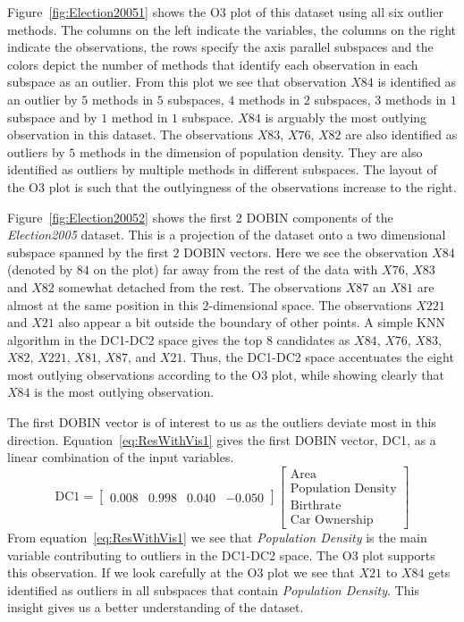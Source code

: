 \documentclass[letter,12pt]{article}
\begin{document}
Figure~\ref{fig:Election20051} shows the O3 plot of this dataset using all six outlier methods. The columns on the left indicate the variables, the columns on the right indicate the observations, the rows specify the axis parallel subspaces and the colors depict the number of methods that identify each observation in each subspace as an outlier. From this plot we see that observation $X84$ is identified as an outlier by $5$ methods in $5$ subspaces, $4$ methods in $2$ subspaces, $3$ methods in $1$ subspace and by $1$ method in $1$ subspace. $X84$ is arguably the most outlying observation in this dataset. The observations $X83$, $X76$, $X82$ are also identified as outliers by $5$ methods in the dimension of population density. They are also identified as outliers by multiple methods in different subspaces. The layout of the O3 plot is such that the outlyingness of the observations increase to the right.

Figure~\ref{fig:Election20052} shows the first $2$ DOBIN components of the \textit{Election2005} dataset. This is a projection of the dataset onto a two dimensional subspace spanned by the first $2$ DOBIN vectors. Here we see the observation $X84$ (denoted by $84$ on the plot) far away from the rest of the data with $X76$, $X83$ and $X82$ somewhat detached from the rest. The observations $X87$ an $X81$ are almost at the same position in this $2$-dimensional space. The observations $X221$ and $X21$ also appear a bit outside the boundary of other points. A simple KNN algorithm in the DC1-DC2 space gives the top $8$ candidates as $X84$, $X76$, $X83$, $X82$, $X221$, $X81$, $X87$, and $X21$. Thus, the DC1-DC2 space accentuates the eight most outlying observations according to the O3 plot, while showing clearly that $X84$ is the most outlying observation.

The first DOBIN vector is of interest to us as the outliers deviate most in this direction. Equation~\eqref{eq:ResWithVis1} gives the first DOBIN vector, DC1, as a linear combination of the input variables.
\begin{equation}\label{eq:ResWithVis1}
	\text{DC1} = \begin{bmatrix}
		0.008 & 0.998 & 0.040 & -0.050
	\end{bmatrix}
	\begin{bmatrix}
		\text{Area}               \\
		\text{Population Density} \\
		\text{Birthrate}          \\
		\text{Car Ownership}
	\end{bmatrix}
\end{equation}
From equation~\eqref{eq:ResWithVis1} we see that \textit{Population Density} is the main variable contributing to outliers in the DC1-DC2 space. The O3 plot supports this observation. If we look carefully at the O3 plot we see that $X21$ to $X84$ gets identified as outliers in all subspaces that contain \textit{Population Density}. This insight gives us a better understanding of the dataset.
\end{document}
